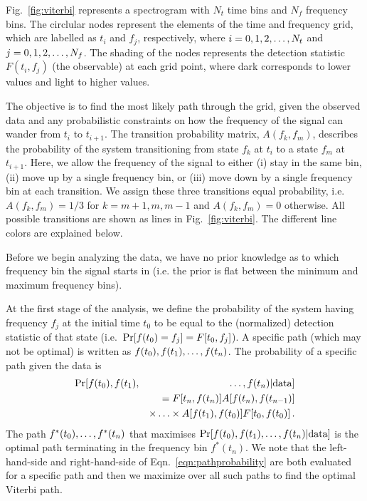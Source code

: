 \documentclass[paper-main.tex]{subfiles}
\begin{document}
Fig.~\ref{fig:viterbi} represents a spectrogram with $N_t$ time bins and $N_f$ frequency bins.
The circlular nodes represent the elements of the time and frequency grid, which are labelled as  
$t_i$ and $f_j$, respectively, where $i=0,1,2,\mathellipsis,N_t$ and $j=0,1,2,\mathellipsis,N_f$. 
The shading of the nodes represents the detection statistic $F(t_i,f_j)$ (the observable) at each grid point, where dark corresponds to lower values and light to higher values. 


The objective is to find the most likely path through the grid, given the observed data and any probabilistic constraints on how the frequency of the signal can wander from $t_i$ to $t_{i+1}$. 
The transition probability matrix, $A(f_k,f_m)$, describes the probability of the system transitioning from state $f_k$ at $t_i$ to a state $f_{m}$ at $t_{i+1}$. 
Here, we allow the frequency of the signal to either (i) stay in the same bin, (ii) move up by a single frequency bin, or (iii) move down by a single frequency bin at each transition. 
We assign these three transitions equal probability, i.e.\ $A(f_k,f_m)=1/3$ for $k=m+1,m,m-1$ and $A(f_k,f_m)=0$ otherwise.
All possible transitions are shown as lines in Fig.~\ref{fig:viterbi}.
The different line colors are explained below. 





Before we begin analyzing the data, we have no prior knowledge as to which frequency bin the signal starts in (i.e. the prior is flat between the minimum and maximum frequency bins).

At the first stage of the analysis, we define the probability of the system having frequency $f_j$ at the initial time $t_0$ to be equal to the (normalized) detection statistic of that state (i.e.\  ${\rm Pr}[f(t_0) = f_j] = F[t_0,f_j]$).
A specific path (which may not be optimal) is written as $f(t_0), f(t_1),\mathellipsis, f(t_n)$. 
The probability of a specific path given the data is 
\begin{eqnarray}
{\rm Pr}[ f(t_0), f(t_1),&&\mathellipsis, f(t_n) | {\rm data}] \nonumber\\
          && =F[t_n,f(t_n)] A[f(t_n),f(t_{n-1})] \nonumber \\
          && \times\mathellipsis\times A[f(t_1),f(t_0)] F[t_0,f(t_0)] \,.
\label{eqn:pathprobability}
\end{eqnarray}
The path $f^\ast(t_0),\mathellipsis,f^\ast(t_n)$ that maximises ${\rm Pr}[ f(t_0), f(t_1),\mathellipsis, f(t_n) | {\rm data}]$ is the optimal path terminating in the frequency bin $f^\ast(t_n)$. 
We note that the left-hand-side and right-hand-side of Eqn.~\ref{eqn:pathprobability} are both evaluated for a specific path and then we maximize over all such paths to find the optimal Viterbi path. 
\end{document}
